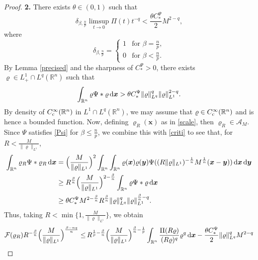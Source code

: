 \documentclass[reqno,11pt]{amsart}
\numberwithin{equation}{section}
\theoremstyle{definition}
\def\dd{{\, \rm d}}
\begin{document}
\begin{proof}
\medskip
{\bf 2.} There exists $\theta \in (0,1)$ such that
 \[
  \delta_{\beta, \frac{n}{p}} \limsup_{t \to 0} \Pi(t) t^{-q} < \frac{\theta C_*^\Psi}{2} M^{2-q},
 \]
  where 
 $$
 \delta_{\beta, \frac{n}{p}} = \begin{cases}
 1 & \mbox{for $\beta = \frac{n}{p}$}, \\
 0 & \mbox{for $\beta < \frac{n}{p}$}.
\end{cases}
  $$
By Lemma \ref{precised} and the sharpness of $C_*^\Psi > 0$, 
there exists $\varrho \in L^1_+\cap L^q(\mathbb{R}^n)$ such that
\begin{equation}\label{criti}
\int_{\mathbb{R}^n} \varrho \Psi * \varrho \dd \boldsymbol{x} > \theta C_*^\Psi \| \varrho \|_{L^q}^q \| \varrho \|_{L^1}^{2-q}.
\end{equation}
By density of $C^\infty_{\rm c}(\mathbb{R}^n)$ in $L^1\cap L^q(\mathbb{R}^n)$, 
we may assume that $\varrho \in C^\infty_{\rm c}(\mathbb{R}^n)$ and is hence a bounded function. 
Now, defining $\varrho_R(\boldsymbol{x})$ as in \eqref{scale}, then
$\varrho_R \in \mathcal{A}_M$. 
Since $\Psi$ satisfies \eqref{Psi} for $\beta \leq \frac{n}{p}$, 
we combine this with \eqref{criti} to see that, for $R < \frac{M}{\|\varrho\|_{L^1}}$,
\begin{align*}
\int_{\mathbb{R}^n} \varrho_R \Psi * \varrho_R \dd \boldsymbol{x} 
& =  \Big (\frac{M}{\|\varrho\|_{L^1}} \Big)^2 \int_{\mathbb{R}^n} 
\int_{\mathbb{R}^n} \varrho(\boldsymbol{x}) \varrho(\boldsymbol{y}) 
\Psi((R\|\varrho\|_{L^1})^{-\frac{1}{n}} M^\frac{1}{n} (\boldsymbol{x} - \boldsymbol{y})) 
\dd \boldsymbol{x} \dd \boldsymbol{y} \\
& \geq R^\frac{\beta}{n} \Big(\frac{M}{\|\varrho\|_{L^1}} \Big)^{2 - \frac{\beta}{n}} \int_{\mathbb{R}^n} \varrho \Psi * \varrho \dd \boldsymbol{x} \\
& \geq \theta C_*^\Psi M^{2-\frac{\beta}{n}} R^\frac{\beta}{n} \| \varrho \|_{L^q}^q \| \varrho \|_{L^1}^{\frac{\beta}{n} - q}.
\end{align*}
Thus, taking $R< \min \big\{1,\frac{M}{\|\varrho\|_{L^1}} \big \}$, we obtain
\begin{align*}
\mathcal{F}(\varrho_R) R^{-\frac{\beta}{n}} \Big( \frac{M}{\| \varrho \|_{L^1}} \Big)^{\frac{\beta-nq}{n}} 
\leq &\, R^{\frac{1}{p} - \frac{\beta}{n}} 
\Big( \frac{M}{\| \varrho \|_{L^1}} \Big)^{\frac{\beta}{n}- \frac{1}{p}} 
\int_{\mathbb{R}^n} \frac{\Pi(R \varrho)}{(R \varrho)^q} \varrho^q \dd \boldsymbol{x} 
- \frac{\theta C_*^\Psi}{2} \| \varrho \|_{L^q}^q M^{2-q} \\

\end{align*}
\end{proof}
\end{document}
